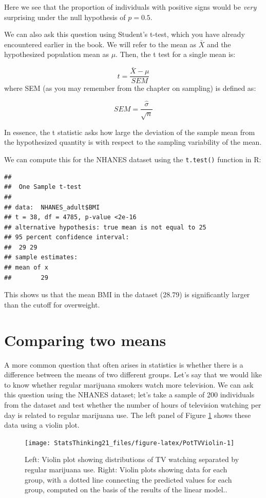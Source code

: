 \documentclass[12pt,]{book}
\theoremstyle{definition}
\theoremstyle{definition}
\theoremstyle{definition}
\theoremstyle{remark}
\begin{document}
Here we see that the proportion of individuals with positive signs would be \emph{very} surprising under the null hypothesis of \(p=0.5\).

We can also ask this question using Student's t-test, which you have already encountered earlier in the book. We will refer to the mean as \(\bar{X}\) and the hypothesized population mean as \(\mu\). Then, the t test for a single mean is:

\[
t = \frac{\bar{X} - \mu}{SEM}
\]
where SEM (as you may remember from the chapter on sampling) is defined as:

\[
SEM = \frac{\hat{\sigma}}{\sqrt{n}}
\]

In essence, the t statistic asks how large the deviation of the sample mean from the hypothesized quantity is with respect to the sampling variability of the mean.

We can compute this for the NHANES dataset using the \texttt{t.test()} function in R:

\begin{verbatim}
## 
##  One Sample t-test
## 
## data:  NHANES_adult$BMI
## t = 38, df = 4785, p-value <2e-16
## alternative hypothesis: true mean is not equal to 25
## 95 percent confidence interval:
##  29 29
## sample estimates:
## mean of x 
##        29
\end{verbatim}

This shows us that the mean BMI in the dataset (28.79) is significantly larger than the cutoff for overweight.

\hypertarget{comparing-two-means}{%
\section{Comparing two means}\label{comparing-two-means}}

A more common question that often arises in statistics is whether there is a difference between the means of two different groups. Let's say that we would like to know whether regular marijuana smokers watch more television. We can ask this question using the NHANES dataset; let's take a sample of 200 individuals from the dataset and test whether the number of hours of television watching per day is related to regular marijuana use. The left panel of Figure \ref{fig:PotTVViolin} shows these data using a violin plot.

\begin{figure}
\texttt{[image: StatsThinking21\_files/figure-latex/PotTVViolin-1]} \caption{Left: Violin plot showing distributions of TV watching separated by regular marijuana use. Right: Violin plots showing data for each group, with a dotted line connecting the predicted values for each group, computed on the basis of the results of the linear model.. }\label{fig:PotTVViolin}
\end{figure}
\end{document}
